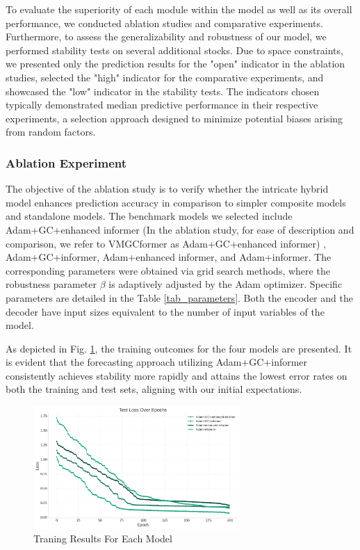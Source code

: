 \documentclass[sn-mathphys,Numbered]{sn-jnl}
\theoremstyle{thmstyleone}%
\theoremstyle{thmstyletwo}%
\theoremstyle{thmstylethree}%
\begin{document}
To evaluate the superiority of each module within the model as well as its overall performance, we conducted ablation studies and comparative experiments. Furthermore, to assess the generalizability and robustness of our model, we performed stability tests on several additional stocks. Due to space constraints, we presented only the prediction results for the "open" indicator in the ablation studies, selected the "high" indicator for the comparative experiments, and showcased the "low" indicator in the stability tests. The indicators chosen typically demonstrated median predictive performance in their respective experiments, a selection approach designed to minimize potential biases arising from random factors.

\subsubsection{Ablation Experiment}\label{subsubsec1}

The objective of the ablation study is to verify whether the intricate hybrid model enhances prediction accuracy in comparison to simpler composite models and standalone models. The benchmark models we selected include Adam+GC+enhanced informer (In the ablation study, for ease of description and comparison, we refer to VMGCformer as Adam+GC+enhanced informer) , Adam+GC+informer, Adam+enhanced informer, and Adam+informer. The corresponding parameters were obtained via grid search methods, where the robustness parameter \( \beta \) is adaptively adjusted by the Adam optimizer. Specific parameters are detailed in the Table \ref{tab_parameters}. Both the encoder and the decoder have input sizes equivalent to the number of input variables of the model.

As depicted in Fig. \ref{loss}, the training outcomes for the four models are presented. It is evident that the forecasting approach utilizing Adam+GC+informer consistently achieves stability more rapidly and attains the lowest error rates on both the training and test sets, aligning with our initial expectations.

\begin{figure}[h]
    \centering
    \includegraphics[width=0.7\textwidth]{pngs/loss.png}
    \caption{ Traning Results For Each Model}
    \label{loss}
\end{figure}
\end{document}
